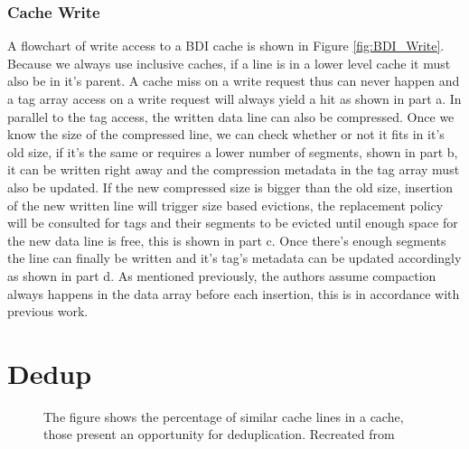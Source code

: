 \subsubsection{Cache Write}
A flowchart of write access to a BDI cache is shown in Figure \ref{fig:BDI_Write}. Because we always use inclusive caches, if a line is in a lower level cache it must also be in it's parent. A cache miss on a write request thus can never happen and a tag array access on a write request will always yield a hit as shown in part a. In parallel to the tag access, the written data line can also be compressed. Once we know the size of the compressed line, we can check whether or not it fits in it's old size, if it's the same or requires a lower number of segments, shown in part b, it can be written right away and the compression metadata in the tag array must also be updated. If the new compressed size is bigger than the old size, insertion of the new written line will trigger size based evictions, the replacement policy will be consulted for tags and their segments to be evicted until enough space for the new data line is free, this is shown in part c. Once there's enough segments the line can finally be written and it's tag's metadata can be updated accordingly as shown in part d.
As mentioned previously, the authors assume compaction always happens in the data array before each insertion, this is in accordance with previous work.

\section{Dedup}
\label{sec:Dedup}
\begin{figure}
    \caption[Similar lines in a cache]{The figure shows the percentage of similar cache lines in a cache, those present an opportunity for deduplication. Recreated from \protect\cite{dedup}}
    \label{fig:DedupPotential}
\end{figure}

